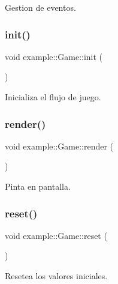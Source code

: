 Gestion de eventos. 

\mbox{\label{classexample_1_1_game_ae43c4f24d071be6210e9273fa5bd6479}} 
\subsubsection{\texorpdfstring{init()}{init()}}
{\footnotesize\ttfamily void example\+::\+Game\+::init (\begin{DoxyParamCaption}{ }\end{DoxyParamCaption})}



Inicializa el flujo de juego. 

\mbox{\label{classexample_1_1_game_a80ca8afc0d6e9d533d4b7ea0fd333381}} 
\subsubsection{\texorpdfstring{render()}{render()}}
{\footnotesize\ttfamily void example\+::\+Game\+::render (\begin{DoxyParamCaption}{ }\end{DoxyParamCaption})}



Pinta en pantalla. 

\mbox{\label{classexample_1_1_game_a3f27f46dd53f8fe477772c2e6bbbef60}} 
\subsubsection{\texorpdfstring{reset()}{reset()}}
{\footnotesize\ttfamily void example\+::\+Game\+::reset (\begin{DoxyParamCaption}{ }\end{DoxyParamCaption})}



Resetea los valores iniciales. 

\mbox{\label{classexample_1_1_game_a01f28031d3b384412bdac6e433171743}} 
